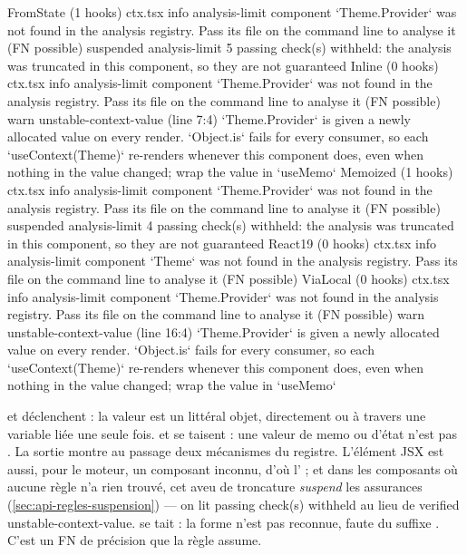 \begin{sortie}
  FromState  (1 hooks)  ctx.tsx
    info   analysis-limit  component `Theme.Provider` was not found in the analysis registry. Pass its file on the command line to analyse it (FN possible)
    suspended  analysis-limit  5 passing check(s) withheld: the analysis was truncated in this component, so they are not guaranteed
  Inline  (0 hooks)  ctx.tsx
    info   analysis-limit  component `Theme.Provider` was not found in the analysis registry. Pass its file on the command line to analyse it (FN possible)
    warn   unstable-context-value  (line 7:4)  `Theme.Provider` is given a newly allocated value on every render. `Object.is` fails for every consumer, so each `useContext(Theme)` re-renders whenever this component does, even when nothing in the value changed; wrap the value in `useMemo`
  Memoized  (1 hooks)  ctx.tsx
    info   analysis-limit  component `Theme.Provider` was not found in the analysis registry. Pass its file on the command line to analyse it (FN possible)
    suspended  analysis-limit  4 passing check(s) withheld: the analysis was truncated in this component, so they are not guaranteed
  React19  (0 hooks)  ctx.tsx
    info   analysis-limit  component `Theme` was not found in the analysis registry. Pass its file on the command line to analyse it (FN possible)
  ViaLocal  (0 hooks)  ctx.tsx
    info   analysis-limit  component `Theme.Provider` was not found in the analysis registry. Pass its file on the command line to analyse it (FN possible)
    warn   unstable-context-value  (line 16:4)  `Theme.Provider` is given a newly allocated value on every render. `Object.is` fails for every consumer, so each `useContext(Theme)` re-renders whenever this component does, even when nothing in the value changed; wrap the value in `useMemo`
\end{sortie}

 et  déclenchent : la valeur est un littéral objet, directement ou à travers une variable liée une seule fois.  et  se taisent : une valeur de memo ou d'état n'est pas . La sortie montre au passage deux mécanismes du registre. L'élément JSX  est aussi, pour le moteur, un composant inconnu, d'où l'\Info{}  ; et dans les composants où aucune règle n'a rien trouvé, cet aveu de troncature \emph{suspend} les assurances  (\cref{sec:api-regles-suspension}) --- on lit  passing check(s) withheld\fg{} au lieu de \og verified unstable-context-value\fg.  se tait : la forme  n'est pas reconnue, faute du suffixe . C'est un FN de précision que la règle assume.

